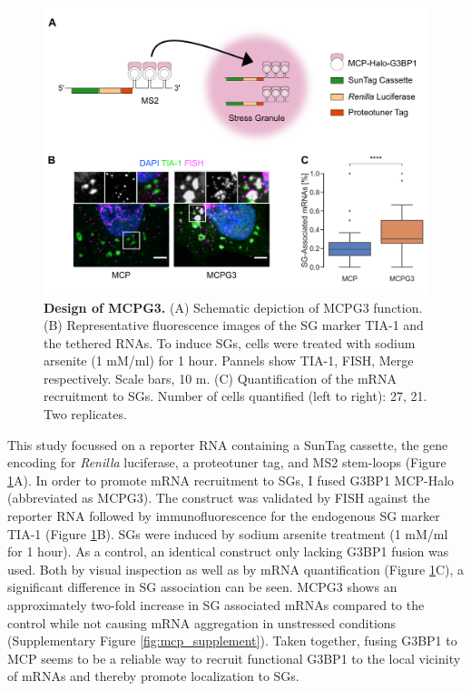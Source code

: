 \begin{figure}[b!]
    \centering
    \includegraphics[width=\linewidth]{images/figure2}
    \caption{\textbf{Design of MCPG3.}
        (A) Schematic depiction of MCPG3 function.
        (B) Representative fluorescence images of the SG marker
            TIA-1 and the tethered RNAs.
            To induce SGs, cells were treated with sodium arsenite (1 mM/ml) for 1 hour.
            Pannels show TIA-1, FISH, Merge respectively.
            Scale bars, 10 \textmu m.
        (C) Quantification of the mRNA recruitment to SGs.
            Number of cells quantified (left to right): 27, 21. Two replicates.
    }
    \label{fig:mcp_images}
\end{figure}

This study focussed on a reporter RNA containing a SunTag cassette, the gene encoding for \textit{Renilla} luciferase, a proteotuner tag, and MS2 stem-loops (Figure \ref{fig:mcp_images}A).
In order to promote mRNA recruitment to SGs, I fused G3BP1 MCP-Halo (abbreviated as MCPG3).
The construct was validated by FISH against the reporter RNA followed by immunofluorescence for the endogenous SG marker TIA-1 \cite{kedersha_rna-binding_1999} (Figure \ref{fig:mcp_images}B).
SGs were induced by sodium arsenite treatment (1 mM/ml for 1 hour).
As a control, an identical construct only lacking G3BP1 fusion was used.
Both by visual inspection as well as by mRNA quantification (Figure \ref{fig:mcp_images}C), a significant difference in SG association can be seen.
MCPG3 shows an approximately two-fold increase in SG associated mRNAs compared to the control while not causing mRNA aggregation in unstressed conditions (Supplementary Figure \ref{fig:mcp_supplement}).
Taken together, fusing G3BP1 to MCP seems to be a reliable way to recruit functional G3BP1 to the local vicinity of mRNAs and thereby promote localization to SGs.


